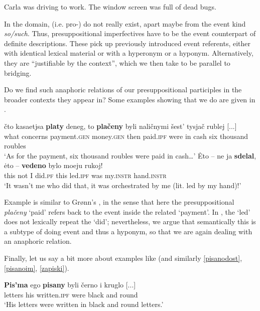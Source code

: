 \documentclass[output=paper,modfonts,newtxmath,hidelinks
\ChapterDOI{10.5281/zenodo.2545513}
]{langscibook}
\begin{document}
\ea
Carla was driving to work. The window screen was full of dead bugs.\label{Carla}
\z

\noindent In the  domain,  (i.e. pro-)  do not really exist, apart maybe from the event kind  \textit{so/such}. Thus, presuppositional imperfectives have to be the event counterpart of definite descriptions. These pick up previously introduced event referents, either with identical lexical material or with a hyperonym or a hyponym. Alternatively, they are ``justifiable by the context'', which we then take to be parallel to bridging.

Do we  find such anaphoric relations of our presuppositional  participles in the broader contexts they appear in? Some examples showing that we do are given in .

\ea\label{anaphOF}
\ea\gll 	čto kasaetjsa \textbf{platy} deneg, to \textbf{plačeny} byli naličnymi šest' tysjač rublej [...]\\
	what concerns payment.\textsc{gen} money.\textsc{gen} then paid.\textsc{ipf} were {in cash} six thousand roubles\\
\glt	`As for the payment, six thousand roubles were paid in cash\dots'\label{platy}
\ex\gll 	\.{E}to -- ne ja \textbf{sdelal}, \.{e}to -- \textbf{vedeno} bylo moeju rukoj!\\
	this {} not I did.\textsc{pf} this {} led.\textsc{ipf} was my.\textsc{instr} hand.\textsc{instr}\\
\glt	`It wasn't me who did that, it was orchestrated by me (lit. led by my hand)!'\label{rukoj}	
\z\z

\noindent Example  is similar to Grønn's , in the sense that here the presuppositional   \textit{plačeny} `paid' refers back to the event inside the related  `payment'. In , the  `led' does not lexically repeat the  `did'; nevertheless, we argue that semantically this is a subtype of doing event and thus a hyponym, so that we are again dealing with an anaphoric relation. 

Finally, let us say a bit more about examples like  (and similarly \ref{pisanodost}, \ref{pisanoim}, \ref{zapiski}). 

\ea\gll	\textbf{Pis'ma} ego \textbf{pisany} byli černo i kruglo [...]\\
	letters his written.\textsc{ipf} were black and round \\
\glt	`His letters were written in black and round letters.'\label{kruglo}
\z
\end{document}
